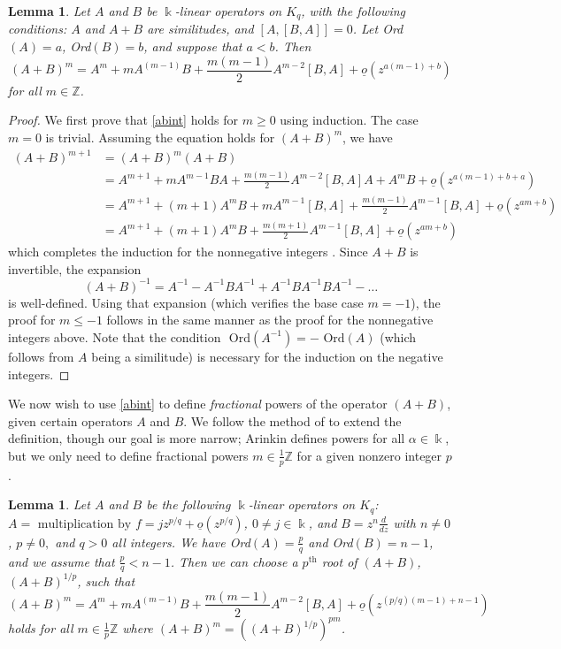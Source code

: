 \documentclass[11pt]{amsart}
\theoremstyle{plain}
\newtheorem{lemma}[theorem]{Lemma}
\theoremstyle{definition}
\theoremstyle{remark}
\def\O{\text{ Ord}}
\begin{document}
\begin{lemma}\label{abintlemma}
    Let $A$ and $B$ be $\Bbbk$-linear operators on $K_q$, with the following conditions:  $A$ and $A+B$ are similitudes, and $[A,[B,A]]=0$. Let Ord$(A)=a$, Ord$(B)=b$, and suppose that $a< b$.  Then
    \begin{equation}\label{abint}
        (A+B)^{m}=A^{m}+mA^{(m-1)}B+\frac{m(m-1)}{2}A^{m-2}[B,A] + \underline{o}(z^{a(m-1)+b})
    \end{equation}for all $m\in\mathbb{Z}$.
\end{lemma}
\begin{proof} We first prove that \eqref{abint} holds for $m\geq 0$ using induction. The case $m=0$ is trivial.
Assuming the equation holds for $(A+B)^m$, we have
    \begin{equation*}
    \begin{split}
        (A+B)^{m+1} & = (A+B)^{m}(A+B)\\
         & = A^{m+1}+mA^{m-1}BA+\frac{m(m-1)}{2}A^{m-2}[B,A]A+A^mB + \underline{o}(z^{a(m-1)+b+a})\\
          & = A^{m+1}+(m+1)A^{m}B+mA^{m-1}[B,A]+\frac{m(m-1)}{2}A^{m-1}[B,A] + \underline{o}(z^{am+b})\\
                    & = A^{m+1}+(m+1)A^{m}B+\frac{m(m+1)}{2}A^{m-1}[B,A] + \underline{o}(z^{am+b})
    \end{split}
    \end{equation*}which completes the induction for the nonnegative integers .
 Since $A+B$ is invertible, the expansion
 $$(A+B)^{-1}=A^{-1}-A^{-1}BA^{-1}+A^{-1}BA^{-1}BA^{-1}-\dots$$
 is well-defined. Using that expansion (which verifies the base case $m=-1$), the proof for $m\leq -1$ follows in the same manner as the proof for the nonnegative integers above.  Note that the condition $\O(A^{-1})=-\O(A)$ (which follows from $A$ being a similitude) is necessary for the induction on the negative integers.
\end{proof}


We now wish to use \eqref{abint} to define \emph{fractional} powers of the operator $(A+B)$, given certain operators $A$ and $B$.  We follow the method of \cite[Section 7.1]{dima} to extend the definition, though our goal is more narrow; Arinkin defines powers for all $\alpha\in \Bbbk$, but we only need to define fractional powers $m\in\frac{1}{p}\mathbb{Z}$ for a given nonzero integer $p$.

\begin{lemma}\label{abratlemma}
    Let $A$ and $B$ be the following $\Bbbk$-linear operators on $K_q$: $A=\text{ multiplication by } f= jz^{p/q}+ \underline{o}(z^{p/q})$, $0\neq j \in \Bbbk$, and $B=z^n\frac{d}{dz}$ with $n\neq 0$, $p\neq 0,$ and $q> 0$ all integers.  We have Ord$(A)=\frac{p}{q}$ and  Ord$(B)=n-1$, and we assume that $\frac{p}{q}< n-1$. Then we can choose a $p^{\text{th}}$ root of $(A+B)$, $(A+B)^{1/p}$, such that
\begin{equation*}
        (A+B)^{m}=A^{m}+mA^{(m-1)}B+\frac{m(m-1)}{2}A^{m-2}[B,A] + \underline{o}(z^{(p/q)(m-1)+n-1})
    \end{equation*} holds for all $m\in \frac{1}{p}\mathbb{Z}$ where $(A+B)^{m}=((A+B)^{1/p})^{pm}$.
\end{lemma}
\end{document}
